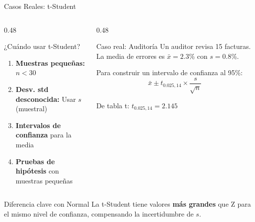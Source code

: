\documentclass[10pt]{beamer}
\begin{document}
\begin{frame}{Casos Reales: t-Student}
\begin{columns}[T]
\begin{column}{0.48\textwidth}
\begin{block}{¿Cuándo usar t-Student?}
\begin{enumerate}
  \item \textbf{Muestras pequeñas:} $n < 30$
  \item \textbf{Desv. std desconocida:} Usar $s$ (muestral)
  \item \textbf{Intervalos de confianza} para la media
  \item \textbf{Pruebas de hipótesis} con muestras pequeñas
\end{enumerate}
\end{block}
\end{column}
\begin{column}{0.48\textwidth}
\begin{exampleblock}{Caso real: Auditoría}
\footnotesize
Un auditor revisa 15 facturas. La media de errores es $\bar{x} = 2.3$\% con $s = 0.8$\%.

Para construir un intervalo de confianza al 95\%:
$$\bar{x} \pm t_{0.025, 14} \times \frac{s}{\sqrt{n}}$$

De tabla t: $t_{0.025, 14} = 2.145$
\end{exampleblock}
\end{column}
\end{columns}

\vspace{0.3cm}
\begin{alertblock}{Diferencia clave con Normal}
La t-Student tiene valores \textbf{más grandes} que Z para el mismo nivel de confianza, compensando la incertidumbre de $s$.
\end{alertblock}
\end{frame}
\end{document}
